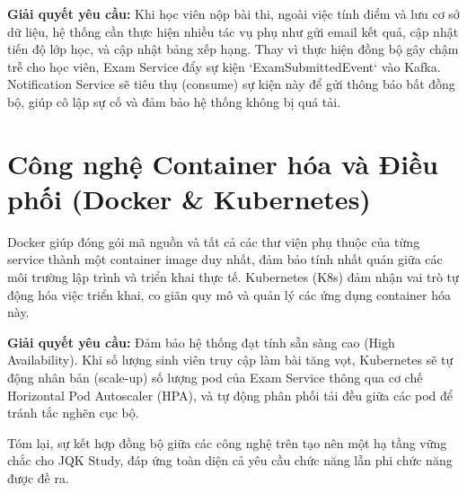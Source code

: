 \documentclass[../DoAn.tex]{subfiles}
\begin{document}
\textbf{Giải quyết yêu cầu:} Khi học viên nộp bài thi, ngoài việc tính điểm và lưu cơ sở dữ liệu, hệ thống cần thực hiện nhiều tác vụ phụ như gửi email kết quả, cập nhật tiến độ lớp học, và cập nhật bảng xếp hạng. Thay vì thực hiện đồng bộ gây chậm trễ cho học viên, Exam Service đẩy sự kiện `ExamSubmittedEvent` vào Kafka. Notification Service sẽ tiêu thụ (consume) sự kiện này để gửi thông báo bất đồng bộ, giúp cô lập sự cố và đảm bảo hệ thống không bị quá tải.

\section{Công nghệ Container hóa và Điều phối (Docker \& Kubernetes)}
\label{section:3.8}
Docker giúp đóng gói mã nguồn và tất cả các thư viện phụ thuộc của từng service thành một container image duy nhất, đảm bảo tính nhất quán giữa các môi trường lập trình và triển khai thực tế. Kubernetes (K8s) đảm nhận vai trò tự động hóa việc triển khai, co giãn quy mô và quản lý các ứng dụng container hóa này.

\textbf{Giải quyết yêu cầu:} Đảm bảo hệ thống đạt tính sẵn sàng cao (High Availability). Khi số lượng sinh viên truy cập làm bài tăng vọt, Kubernetes sẽ tự động nhân bản (scale-up) số lượng pod của Exam Service thông qua cơ chế Horizontal Pod Autoscaler (HPA), và tự động phân phối tải đều giữa các pod để tránh tắc nghẽn cục bộ.

Tóm lại, sự kết hợp đồng bộ giữa các công nghệ trên tạo nên một hạ tầng vững chắc cho JQK Study, đáp ứng toàn diện cả yêu cầu chức năng lẫn phi chức năng được đề ra.
\end{document}
